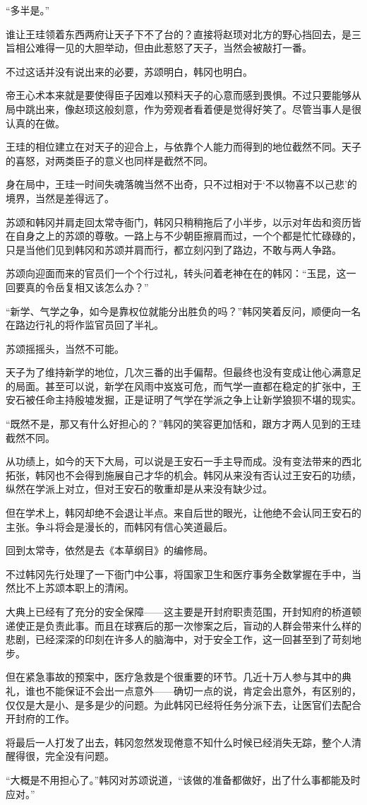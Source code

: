 “多半是。”

谁让王珪领着东西两府让天子下不了台的？直接将赵顼对北方的野心挡回去，是三旨相公难得一见的大胆举动，但由此惹怒了天子，当然会被敲打一番。

不过这话并没有说出来的必要，苏颂明白，韩冈也明白。

帝王心术本来就是要使得臣子因难以预料天子的心意而感到畏惧。不过只要能够从局中跳出来，像赵顼这般刻意，作为旁观者看着便是觉得好笑了。尽管当事人是很认真的在做。

王珪的相位建立在对天子的迎合上，与依靠个人能力而得到的地位截然不同。天子的喜怒，对两类臣子的意义也同样是截然不同。

身在局中，王珪一时间失魂落魄当然不出奇，只不过相对于‘不以物喜不以己悲’的境界，当然是差得远了。

苏颂和韩冈并肩走回太常寺衙门，韩冈只稍稍拖后了小半步，以示对年齿和资历皆在自身之上的苏颂的尊敬。一路上与不少朝臣擦肩而过，一个个都是忙忙碌碌的，只是当他们见到韩冈和苏颂并肩而行，都立刻闪到了路边，不敢与两人争路。

苏颂向迎面而来的官员们一个个行过礼，转头问着老神在在的韩冈：“玉昆，这一回要真的令岳复相又该怎么办？”

“新学、气学之争，如今是靠权位就能分出胜负的吗？”韩冈笑着反问，顺便向一名在路边行礼的将作监官员回了半礼。

苏颂摇摇头，当然不可能。

天子为了维持新学的地位，几次三番的出手偏帮。但最终也没有变成让他心满意足的局面。甚至可以说，新学在风雨中岌岌可危，而气学一直都在稳定的扩张中，王安石被任命主持殷墟发掘，正是证明了气学在学派之争上让新学狼狈不堪的现实。

“既然不是，那又有什么好担心的？”韩冈的笑容更加恬和，跟方才两人见到的王珪截然不同。

从功绩上，如今的天下大局，可以说是王安石一手主导而成。没有变法带来的西北拓张，韩冈也不会得到施展自己才华的机会。韩冈从来没有否认过王安石的功绩，纵然在学派上对立，但对王安石的敬重却是从来没有缺少过。

但在学术上，韩冈却绝不会退让半点。来自后世的眼光，让他绝不会认同王安石的主张。争斗将会是漫长的，而韩冈有信心笑道最后。

回到太常寺，依然是去《本草纲目》的编修局。

不过韩冈先行处理了一下衙门中公事，将国家卫生和医疗事务全数掌握在手中，当然比不上苏颂本职上的清闲。

大典上已经有了充分的安全保障——这主要是开封府职责范围，开封知府的桥道顿递使正是负责此事。而且在球赛后的那一次惨案之后，盲动的人群会带来什么样的悲剧，已经深深的印刻在许多人的脑海中，对于安全工作，这一回甚至到了苛刻地步。

但在紧急事故的预案中，医疗急救是个很重要的环节。几近十万人参与其中的典礼，谁也不能保证不会出一点意外——确切一点的说，肯定会出意外，有区别的，仅仅是大是小、是多是少的问题。为此韩冈已经将任务分派下去，让医官们去配合开封府的工作。

将最后一人打发了出去，韩冈忽然发现倦意不知什么时候已经消失无踪，整个人清醒得很，完全没有问题。

“大概是不用担心了。”韩冈对苏颂说道，“该做的准备都做好，出了什么事都能及时应对。”


